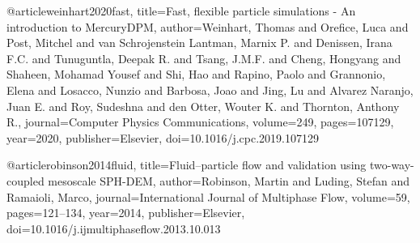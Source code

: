 @article{weinhart2020fast,
  title={Fast, flexible particle simulations - An introduction to MercuryDPM},
  author={Weinhart, Thomas and Orefice, Luca and Post, Mitchel and van Schrojenstein Lantman, Marnix P. and Denissen, Irana F.C. and Tunuguntla, Deepak R. and Tsang, J.M.F. and Cheng, Hongyang and Shaheen, Mohamad Yousef and Shi, Hao and Rapino, Paolo and Grannonio, Elena and Losacco, Nunzio and Barbosa, Joao and Jing, Lu and Alvarez Naranjo, Juan E. and Roy, Sudeshna and den Otter, Wouter K. and Thornton, Anthony R.},
  journal={Computer Physics Communications},
  volume={249},
  pages={107129},
  year={2020},
  publisher={Elsevier},
  doi={10.1016/j.cpc.2019.107129}
}

@article{robinson2014fluid,
  title={Fluid--particle flow and validation using two-way-coupled mesoscale SPH-DEM},
  author={Robinson, Martin and Luding, Stefan and Ramaioli, Marco},
  journal={International Journal of Multiphase Flow},
  volume={59},
  pages={121--134},
  year={2014},
  publisher={Elsevier},
  doi={10.1016/j.ijmultiphaseflow.2013.10.013}
}
